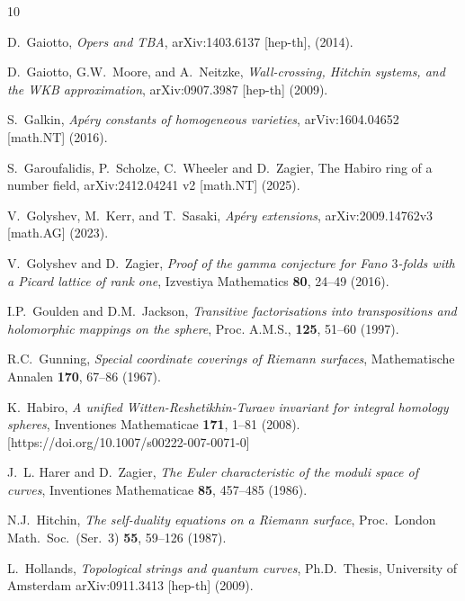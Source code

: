 \documentclass{amsart}
\theoremstyle{definition}
\numberwithin{equation}{section}
\numberwithin{figure}{section}
\begin{document}
\begin{thebibliography}{10}
  
  D.~Gaiotto,
  \emph{Opers and TBA},
  arXiv:1403.6137 [hep-th], (2014).
  
 
 
  
D.~Gaiotto, G.W.~Moore, and 
A.~Neitzke,
\emph{Wall-crossing, Hitchin systems, and the WKB 
approximation},
arXiv:0907.3987 [hep-th] (2009).		


S.~Galkin, 
\emph{Ap\'ery constants of homogeneous varieties},
arViv:1604.04652 [math.NT] (2016).

 
S.~Garoufalidis, P.~Scholze, C.~Wheeler and D.~Zagier,
{The Habiro ring of a number field},
 arXiv:2412.04241 v2 [math.NT]  (2025).




V.~Golyshev, M.~Kerr, and T.~Sasaki,
\emph{Ap\'ery extensions},
 	arXiv:2009.14762v3 [math.AG] (2023).


V.~Golyshev and D.~Zagier, 
\emph{Proof of the gamma conjecture for Fano $3$-folds with a Picard 
lattice of rank one}, Izvestiya  Mathematics \textbf{80}, 24--49 (2016).



  I.P.~Goulden and D.M.~Jackson,
  \emph{Transitive factorisations into transpositions and
  holomorphic mappings on the sphere},
  Proc. A.M.S., \textbf{125}, 51--60 (1997).


 

 R.C.~Gunning, 
\emph{Special coordinate coverings of Riemann surfaces}, 
Mathematische Annalen \textbf{170}, 67--86 (1967).


 K.~Habiro, 
\emph{A unified Witten-Reshetikhin-Turaev invariant for integral homology
spheres},
 Inventiones Mathematicae \textbf{171}, 1--81 (2008). 
 [https:/\!/doi.org/10.1007/s00222-007-0071-0]


J.~L. Harer and D.~Zagier, \emph{The {Euler} characteristic of the moduli
  space of curves}, Inventiones Mathematicae \textbf{85}, 457--485
   (1986).



N.J.~Hitchin, 
\emph{The self-duality equations 
on a Riemann surface},
Proc.\ London Math.\ Soc.\ (Ser.\ 3)
\textbf{55}, 59--126  (1987).


 



 L.~Hollands,
 \emph{Topological strings and quantum curves},
 Ph.D.\ Thesis, University of Amsterdam
  arXiv:0911.3413 [hep-th] (2009).
  


\end{thebibliography}
\end{document}

